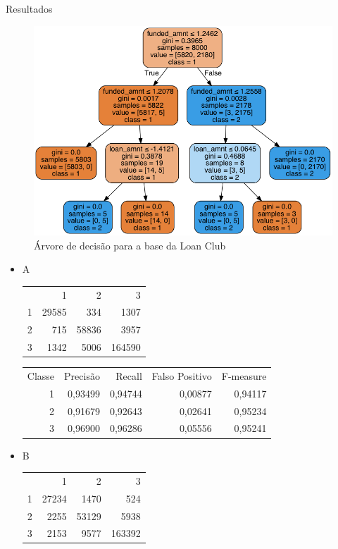 \documentclass[final,hyperref={pdfpagelabels=false, brazil}]{beamer}
\begin{document}
\begin{frame}[t]
\begin{columns}[t]
\begin{column}{.465\textwidth}
\begin{block}{Resultados}
\begin{itemize}
\begin{figure}
\includegraphics[width=0.7\linewidth]{loan.png}
\caption{Árvore de decisão para a base da Loan Club}
\end{figure}
\end{itemize}

\begin{itemize}
\item A
\begin{tabular}{ r r r r }

         & 1 & 2 & 3 \\
    1    & 29585 & 334   & 1307  \\
    2    & 715   & 58836 & 3957  \\
    3    & 1342  & 5006  & 164590
\end{tabular}

\begin{tabular}{ r r r r r }

  Classe & Precisão & Recall  & Falso Positivo & F-measure  \\
    1    & 0,93499  & 0,94744 & 0,00877        & 0,94117    \\
    2    & 0,91679  & 0,92643 & 0,02641        & 0,95234    \\
    3    & 0,96900  & 0,96286 & 0,05556        & 0,95241
\end{tabular}
\end{itemize}

\begin{itemize}

\item B
\begin{tabular}{ r r r r }

         & 1 & 2 & 3 \\
    1    & 27234 & 1470   & 524  \\
    2    & 2255   & 53129 & 5938  \\
    3    & 2153  & 9577   & 163392
\end{tabular}



\end{itemize}
\end{block}
\end{column}
\end{columns}
\end{frame}
\end{document}
